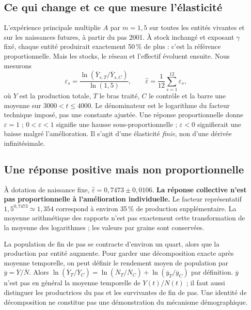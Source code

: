 \subsection{Ce qui change et ce que mesure l'élasticité}
L'expérience principale multiplie $A$ par $m=1{,}5$ sur toutes les
entités vivantes et sur les naissances futures, à partir du pas 2001.
À stock inchangé et exposant $\gamma$ fixé, chaque entité produirait
exactement 50\,\% de plus : c'est la référence proportionnelle.
Mais les stocks, le réseau et l'effectif évoluent ensuite. Nous mesurons
\begin{equation}
 \varepsilon_s=\frac{\ln(\overline Y_{s,T}/\overline Y_{s,C})}{\ln(1{,}5)},
 \qquad \widehat\varepsilon=\frac1{12}\sum_{s=1}^{12}\varepsilon_s,
 \label{eq:eps}
\end{equation}
où $Y$ est la production totale, $T$ le bras traité, $C$ le contrôle et
la barre une moyenne sur $3000<t\le4000$. Le dénominateur est le
logarithme du facteur technique imposé, pas une constante ajustée.
Une réponse proportionnelle donne $\varepsilon=1$ ; $0<\varepsilon<1$
signifie une hausse sous-proportionnelle ; $\varepsilon<0$ signifierait
une baisse malgré l'amélioration. Il s'agit d'une élasticité \emph{finie},
non d'une dérivée infinitésimale.

\subsection{Une réponse positive mais non proportionnelle}
À dotation de naissance fixe, $\widehat\varepsilon=0{,}7473\pm0{,}0106$.
\textbf{La réponse collective n'est pas proportionnelle à l'amélioration
individuelle.} Le facteur représentatif $1{,}5^{0{,}7473}\simeq1{,}354$
correspond à environ 35\,\% de production supplémentaire. La moyenne
arithmétique des rapports n'est pas exactement cette transformation de
la moyenne des logarithmes ; les valeurs par graine sont conservées.


La population de fin de pas se contracte d'environ un quart, alors que
la production par entité augmente. Pour garder une décomposition exacte
après moyenne temporelle, on peut définir le rendement moyen de population
par $\overline y=\overline Y/\overline N$. Alors
$\ln(\overline Y_T/\overline Y_C)=
\ln(\overline N_T/\overline N_C)+\ln(\overline y_T/\overline y_C)$
par définition. $\overline y$ n'est pas en général la moyenne temporelle
de $Y(t)/N(t)$ ; il faut aussi distinguer les productrices du pas et les
survivantes de fin de pas. Une identité de décomposition ne constitue
pas une démonstration du mécanisme démographique.

